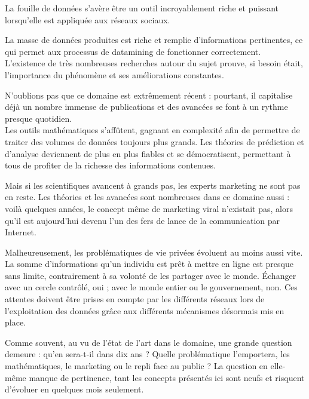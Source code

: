 La fouille de données s'avère être un outil incroyablement riche et puissant lorsqu'elle est appliquée aux réseaux sociaux.

La masse de données produites est riche et remplie d'informations pertinentes, ce qui permet aux processus de datamining de fonctionner correctement.\\
L'existence de très nombreuses recherches autour du sujet prouve, si besoin était, l'importance du phénomène et ses améliorations constantes.

N'oublions pas que ce domaine est extrêmement récent : pourtant, il capitalise déjà un nombre immense de publications et des avancées se font à un rythme presque quotidien.\\
Les outils mathématiques s'affûtent, gagnant en complexité afin de permettre de traiter des volumes de données toujours plus grands. Les théories de prédiction et d'analyse deviennent de plus en plus fiables et se démocratisent, permettant à tous de profiter de la richesse des informations contenues.

Mais si les scientifiques avancent à grands pas, les experts marketing ne sont pas en reste. Les théories et les avancées sont nombreuses dans ce domaine aussi : voilà quelques années, le concept même de marketing viral n'existait pas, alors qu'il est aujourd'hui devenu l'un des fers de lance de la communication par Internet.

Malheureusement, les problématiques de vie privées évoluent au moins aussi vite. La somme d'informations qu'un individu est prêt à mettre en ligne est presque sans limite, contrairement à sa volonté de les partager avec le monde. Échanger avec un cercle contrôlé, oui ; avec le monde entier ou le gouvernement, non. Ces attentes doivent être prises en compte par les différents réseaux lors de l'exploitation des données grâce aux différents mécanismes désormais mis en place.

Comme souvent, au vu de l'état de l'art dans le domaine, une grande question demeure : qu'en sera-t-il dans dix ans ? Quelle problématique l'emportera, les mathématiques, le marketing ou le repli face au public ? La question en elle-même manque de pertinence, tant les concepts présentés ici sont neufs et risquent d'évoluer en quelques mois seulement.


